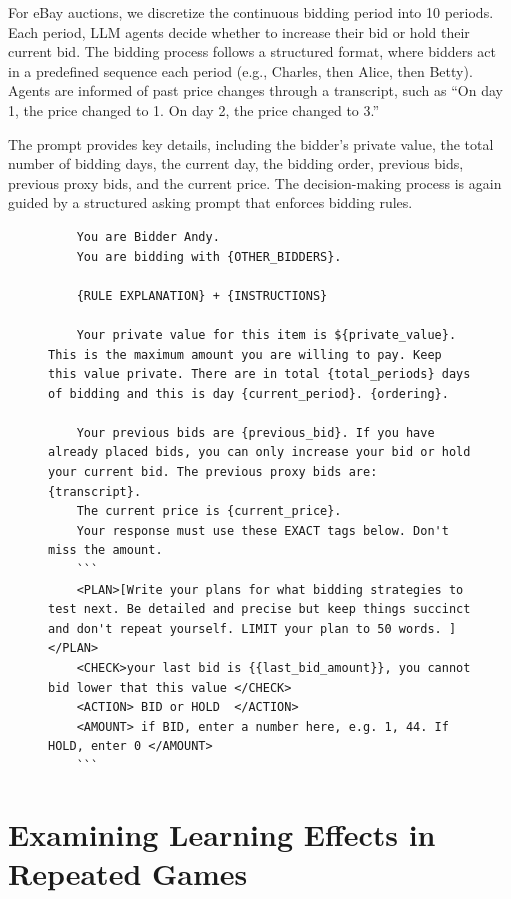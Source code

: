 For eBay auctions, we discretize the continuous bidding period into 10 periods. Each period, LLM agents decide whether to increase their bid or hold their current bid. The bidding process follows a structured format, where bidders act in a predefined sequence each period (e.g., Charles, then Alice, then Betty). Agents are informed of past price changes through a transcript, such as ``On day 1, the price changed to 1. On day 2, the price changed to 3.''

The prompt provides key details, including the bidder's private value, the total number of bidding days, the current day, the bidding order, previous bids, previous proxy bids, and the current price. The decision-making process is again guided by a structured asking prompt that enforces bidding rules. 
\begin{figure}[H]
\centering
\begin{minipage}{0.95\textwidth}
\begin{lstlisting}
    You are Bidder Andy.            
    You are bidding with {OTHER_BIDDERS}.     
    
    {RULE EXPLANATION} + {INSTRUCTIONS} 
    
    Your private value for this item is ${private_value}. This is the maximum amount you are willing to pay. Keep this value private. There are in total {total_periods} days  of bidding and this is day {current_period}. {ordering}.
    
    Your previous bids are {previous_bid}. If you have already placed bids, you can only increase your bid or hold your current bid. The previous proxy bids are: {transcript}.
    The current price is {current_price}.
    Your response must use these EXACT tags below. Don't miss the amount.
    ```
    <PLAN>[Write your plans for what bidding strategies to test next. Be detailed and precise but keep things succinct and don't repeat yourself. LIMIT your plan to 50 words. ]</PLAN>
    <CHECK>your last bid is {{last_bid_amount}}, you cannot bid lower that this value </CHECK>
    <ACTION> BID or HOLD  </ACTION>
    <AMOUNT> if BID, enter a number here, e.g. 1, 44. If HOLD, enter 0 </AMOUNT>
    ```
\end{lstlisting}
\end{minipage}
\label{fig:ebay_prompt}
\end{figure}



\section{Examining Learning Effects in Repeated Games}\label{app:learning}

